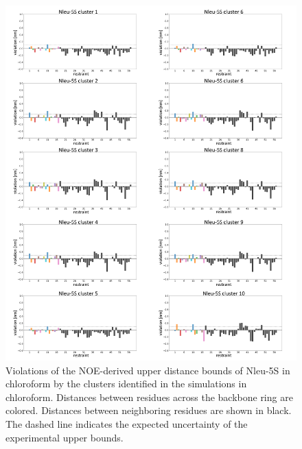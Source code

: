 \begin{figure}[h!]
    \centering
    \includegraphics[width=\textwidth]{7_chapter_5/fig/results/NMR_5S.png}
    \caption{Violations of the NOE-derived upper distance bounds of Nleu-5S in chloroform by the clusters identified in the simulations in chloroform. Distances between residues across the backbone ring are colored. Distances between neighboring residues are shown in black. The dashed line indicates the expected uncertainty of the experimental upper bounds.}
    \label{fig: SINOE violations Nleu-5S}
\end{figure}

